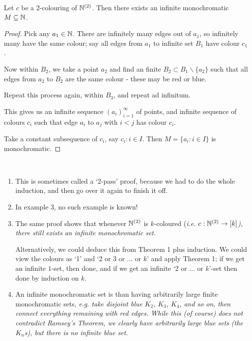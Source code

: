 \documentclass[10pt]{article}
\begin{document}
\begin{theorem}
    Let $c$ be a $2$-colouring of $\mathbb{N}^{(2)}$. Then there exists an infinite monochromatic $M\subseteq \mathbb{N}$.
\end{theorem}
\begin{proof}
    Pick any $a_1 \in \mathbb{N}$. There are infinitely many edges out of $a_1$, so infinitely many have the same colour; say all edges from $a_1$ to infinite set $B_1$ have colour $c_1$.

    Now within $B_2$, we take a point $a_2$ and find an finite $B_2\subset B_1\backslash\{a_2\}$ such that all edges from $a_2$ to $B_2$ are the same colour - these may be red or blue.

    Repeat this process again, within $B_3$, and repeat ad infinitum.

    This gives us an infinite sequence $(a_i)_{i=1}^{\infty}$ of points, and infinite sequence of colours $c_i$ such that edge $a_i$ to $a_j$ with $i<j$ has colour $c_i$.

    Take a constant subsequence of $c_i$, say $c_i:i\in I$. Then $M = \{a_{i}:i\in I\}$ is monochromatic.
\end{proof}
\begin{remark*}[Remarks]\ 
    \begin{enumerate}
        \item This is sometimes called a `2-pass' proof, because we had to do the whole induction, and then go over it again to finish it off.
        \item In example 3, no such example is known!
        \item The same proof shows that whenever $\mathbb{N}^{(2)}$ is $k$-coloured (\it{i.e.} $c:\mathbb{N}^{(2)}\rightarrow [k]$), there still exists an infinite monochromatic set.
        
        Alternatively, we could deduce this from Theorem 1 plus induction. We could view the colours as `1' and `2 or 3 or $\dots$ or $k$' and apply Theorem 1; if we get an infinite $1$-set, then done, and if we get an infinite `2 or $\dots$ or $k$'-set then done by induction on $k$.

        \item An infinite monochromatic set is  than having arbitrarily large finite monochromatic sets, \it{e.g.} take disjoint blue $K_2$, $K_3$, $K_4$, and so on, then connect everything remaining with red edges. While this (of course) does not contradict Ramsey's Theorem, we clearly have arbitrarily large blue sets (the $K_n$s), but there is no \it{infinite} blue set.
    \end{enumerate}
\end{remark*}
\end{document}
